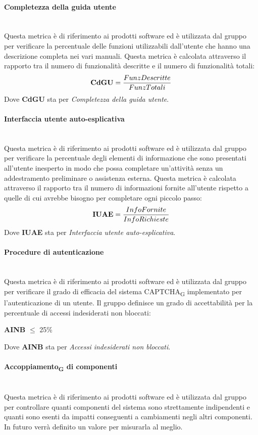 \paragraph{Completezza della guida utente}\mbox{}\\
Questa metrica è di riferimento ai prodotti software ed è utilizzata dal gruppo per verificare la percentuale delle funzioni utilizzabili dall'utente che hanno una descrizione completa nei vari manuali. Questa metrica è calcolata attraverso il rapporto tra il numero di funzionalità descritte e il numero di funzionalità totali:
\begin{align*}
	\centering
	\textbf{CdGU} = \frac{FunzDescritte}{FunzTotali}
\end{align*}
Dove \textbf{CdGU} sta per \textit{Completezza della guida utente}.
\paragraph{Interfaccia utente auto-esplicativa}\mbox{}\\
Questa metrica è di riferimento ai prodotti software ed è utilizzata dal gruppo per verificare la percentuale degli elementi di informazione che sono presentati all’utente inesperto in modo che possa completare un’attività senza un addestramento preliminare o assistenza esterna. Questa metrica è calcolata attraverso il rapporto tra il numero di informazioni fornite all'utente rispetto a quelle di cui avrebbe bisogno per completare ogni piccolo passo:
\begin{align*}
	\centering
	\textbf{IUAE} = \frac{InfoFornite}{InfoRichieste}
\end{align*}
Dove \textbf{IUAE} sta per \textit{Interfaccia utente auto-esplicativa}.
\paragraph{Procedure di autenticazione}\mbox{}\\
Questa metrica è di riferimento ai prodotti software ed è utilizzata dal gruppo per verificare il grado di efficacia del sistema CAPTCHA\textsubscript{G} implementato per l'autenticazione di un utente. Il gruppo definisce un grado di accettabilità per la percentuale di accessi indesiderati non bloccati:
\begin{center}
	\textbf{AINB} $\le$ 25\%
\end{center}
Dove \textbf{AINB} sta per \textit{Accessi indesiderati non bloccati}.
\paragraph{Accoppiamento\textsubscript{G} di componenti}\mbox{}\\
Questa metrica è di riferimento ai prodotti software ed è utilizzata dal gruppo per controllare quanti componenti del sistema sono strettamente  indipendenti e quanti sono esenti da impatti conseguenti a cambiamenti negli altri componenti.
In futuro verrà definito un valore per misurarla al meglio. 
\newpage

